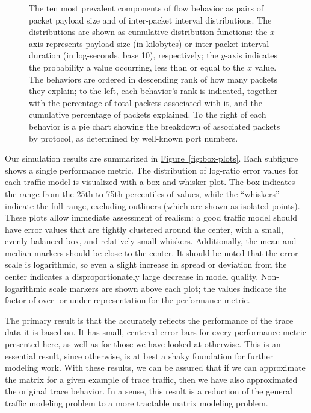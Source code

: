 \documentclass[twocolumn,final]{svjour3}
\newcommand{\caps}[1]{{\smaller{#1}}}
\newcommand{\Figure}[1]{\hyperref[fig:#1]{Figure~\ref*{fig:#1}}}
\begin{document}
\begin{figure}
\caption{%
The ten most prevalent components of flow behavior as pairs of packet payload size and of inter-packet interval distributions.
The distributions are shown as cumulative distribution functions: the $x$-axis represents payload size (in kilobytes) or inter-packet interval duration (in log-seconds, base 10), respectively;
the $y$-axis indicates the probability a value occurring, less than or equal to the $x$ value.
The behaviors are ordered in descending rank of how many packets they explain;
to the left, each behavior's rank is indicated, together with the percentage of total packets associated with it, and the cumulative percentage of packets explained.
To the right of each behavior is a pie chart showing the breakdown of associated packets by protocol, as determined by well-known port numbers.
}
\label{fig:basic-behaviors}
\end{figure}

Our simulation results are summarized in \Figure{box-plots}. Each subfigure shows a single performance metric. The distribution of log-ratio error values for each traffic model is visualized with a box-and-whisker plot. The box indicates the range from the 25th to 75th percentiles of values, while the ``whiskers'' indicate the full range, excluding outliners (which are shown as isolated points). These plots allow immediate assessment of realism: a good traffic model should have error values that are tightly clustered around the center, with a small, evenly balanced box, and relatively small whiskers. Additionally, the mean and median markers should be close to the center. It should be noted that the error scale is logarithmic, so even a slight increase in spread or deviation from the center indicates a disproportionately large decrease in model quality. Non-logarithmic scale markers are shown above each plot; the values indicate the factor of over- or under-representation for the performance metric.

The primary result is that the \caps{GMM} accurately reflects the performance of the trace data it is based on. It has small, centered error bars for every performance metric presented here, as well as for those we have looked at otherwise. This is an essential result, since otherwise, \caps{GMM} is at best a shaky foundation for further modeling work. With these results, we can be assured that if we can approximate the matrix for a given example of trace traffic, then we have also approximated the original trace behavior. In a sense, this result is a reduction of the general traffic modeling problem to a more tractable matrix modeling problem.
\end{document}
